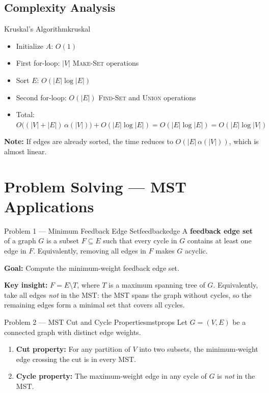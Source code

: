 \subsection{Complexity Analysis}

\begin{complexity}{Kruskal's Algorithm}{kruskal}
\begin{itemize}[noitemsep]
  \item Initialize $A$: $O(1)$
  \item First for-loop: $|V|$ \textsc{Make-Set} operations
  \item Sort $E$: $O(|E| \log |E|)$
  \item Second for-loop: $O(|E|)$ \textsc{Find-Set} and \textsc{Union} operations
  \item Total: $O\bigl((|V|+|E|)\,\alpha(|V|)\bigr) + O(|E|\log|E|) = O(|E|\log|E|) = O(|E|\log|V|)$
\end{itemize}
\textbf{Note:} If edges are already sorted, the time reduces to $O(|E|\,\alpha(|V|))$,
which is almost linear.
\end{complexity}

\section*{Problem Solving — MST Applications}

\begin{remark}{Problem 1 — Minimum Feedback Edge Set}{feedbackedge}
A \textbf{feedback edge set} of a graph $G$ is a subset $F \subseteq E$ such that every cycle
in $G$ contains at least one edge in $F$. Equivalently, removing all edges in $F$ makes $G$ acyclic.

\textbf{Goal:} Compute the minimum-weight feedback edge set.

\textbf{Key insight:} $F = E \setminus T$, where $T$ is a maximum spanning tree of $G$.
Equivalently, take all edges \emph{not} in the MST: the MST spans the graph without cycles,
so the remaining edges form a minimal set that covers all cycles.
\end{remark}

\begin{remark}{Problem 2 — MST Cut and Cycle Properties}{mstprops}
Let $G = (V, E)$ be a connected graph with distinct edge weights.
\begin{enumerate}[noitemsep]
  \item \textbf{Cut property:} For any partition of $V$ into two subsets, the minimum-weight
        edge crossing the cut is in every MST.
  \item \textbf{Cycle property:} The maximum-weight edge in any cycle of $G$ is \emph{not}
        in the MST.
\end{enumerate}
\end{remark}

